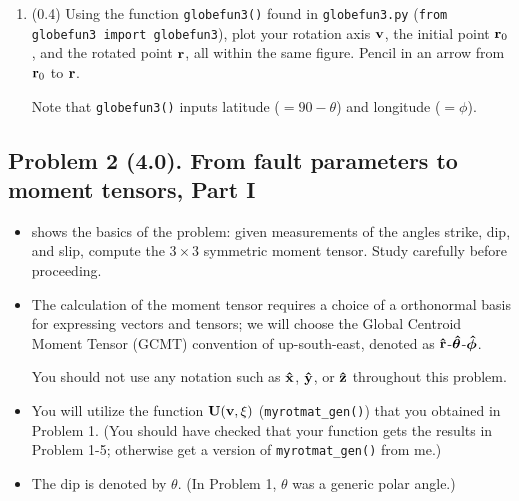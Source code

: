 \documentclass[11pt,titlepage,fleqn]{article}
\newcommand{\rotangB}{\xi}    %
\newcommand{\rotvec}{\bv}      %
\begin{document}
\begin{enumerate}
\item (0.4) Using the function \verb+globefun3()+ found in \verb+globefun3.py+ (\verb+from globefun3 import globefun3+), plot your rotation axis $\rotvec$, the initial point $\mbox{${\bf r}$}_0$, and the rotated point $\mbox{${\bf r}$}$, all within the same figure. Pencil in an arrow from $\mbox{${\bf r}$}_0$ to $\mbox{${\bf r}$}$.

Note that \verb+globefun3()+ inputs latitude ($=90-\theta$) and longitude ($=\phi$).

\end{enumerate}


\subsection*{Problem 2 (4.0). From fault parameters to moment tensors, Part I}

\begin{itemize}
\item {} shows the basics of the problem: given measurements of the angles strike, dip, and slip, compute the $3 \times 3$ symmetric moment tensor. Study  carefully before proceeding.

\item The calculation of the moment tensor requires a choice of a orthonormal basis for expressing vectors and tensors; we will choose the Global Centroid Moment Tensor (GCMT) convention of up-south-east, denoted as $\mbox{\boldmath{$\hat{\rm r}$}}$-$\mbox{\boldmath{$\hat{\theta}$}}$-$\mbox{\boldmath{$\hat{\phi}$}}$.

You should not use any notation such as $\mbox{\boldmath{$\hat{\rm x}$}}$, $\mbox{\boldmath{$\hat{\rm y}$}}$, or $\mbox{\boldmath{$\hat{\rm z}$}}$ throughout this problem.

\item You will utilize the function $\bU(\rotvec,\rotangB)$ (\verb+myrotmat_gen()+) that you obtained in Problem 1. (You should have checked that your function gets the results in Problem 1-5; otherwise get a version of \verb+myrotmat_gen()+ from me.)

\item The dip is denoted by $\theta$. (In Problem 1, $\theta$ was a generic polar angle.)

\end{itemize}
\end{document}
